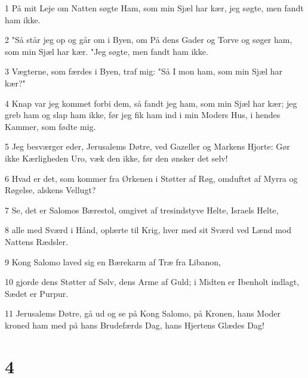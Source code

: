 \par 1 På mit Leje om Natten søgte Ham, som min Sjæl har kær, jeg søgte, men fandt ham ikke.
\par 2 "Så står jeg op og går om i Byen, om På dens Gader og Torve og søger ham, som min Sjæl har kær. "Jeg søgte, men fandt ham ikke.
\par 3 Vægterne, som færdes i Byen, traf mig: "Så I mon ham, som min Sjæl har kær?"
\par 4 Knap var jeg kommet forbi dem, så fandt jeg ham, som min Sjæl har kær; jeg greb ham og slap ham ikke, før jeg fik ham ind i min Moders Hus, i hendes Kammer, som fødte mig.
\par 5 Jeg besværger eder, Jerusalems Døtre, ved Gazeller og Markens Hjorte: Gør ikke Kærligheden Uro, væk den ikke, før den ønsker det selv!
\par 6 Hvad er det, som kommer fra Ørkenen i Støtter af Røg, omduftet af Myrra og Røgelse, alskens Vellugt?
\par 7 Se, det er Salomos Bærestol, omgivet af tresindstyve Helte, Israels Helte,
\par 8 alle med Sværd i Hånd, oplærte til Krig, hver med sit Sværd ved Lænd mod Nattens Rædsler.
\par 9 Kong Salomo laved sig en Bærekarm af Træ fra Libanon,
\par 10 gjorde dens Støtter af Sølv, dens Arme af Guld; i Midten er Ibenholt indlagt, Sædet er Purpur.
\par 11 Jerusalems Døtre, gå ud og se på Kong Salomo, på Kronen, hans Moder kroned ham med på hans Brudefærds Dag, hans Hjertens Glædes Dag!

\chapter{4}

